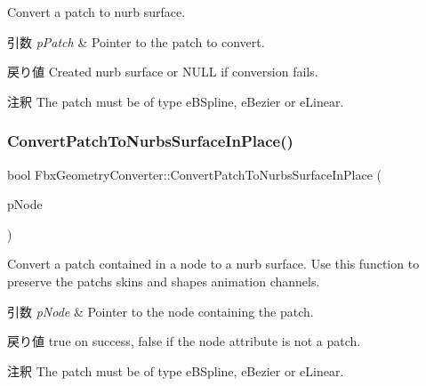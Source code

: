 Convert a patch to nurb surface. 
\begin{DoxyParams}{引数}
{\em p\+Patch} & Pointer to the patch to convert. \\
\hline
\end{DoxyParams}
\begin{DoxyReturn}{戻り値}
Created nurb surface or {\ttfamily N\+U\+LL} if conversion fails. 
\end{DoxyReturn}
\begin{DoxyRemark}{注釈}
The patch must be of type e\+B\+Spline, e\+Bezier or e\+Linear. 
\end{DoxyRemark}
\mbox{\label{class_fbx_geometry_converter_afd5bc619771c69c680b2da7ae4d0c2e4}} 
\subsubsection{\texorpdfstring{Convert\+Patch\+To\+Nurbs\+Surface\+In\+Place()}{ConvertPatchToNurbsSurfaceInPlace()}}
{\footnotesize\ttfamily bool Fbx\+Geometry\+Converter\+::\+Convert\+Patch\+To\+Nurbs\+Surface\+In\+Place (\begin{DoxyParamCaption}\item[{\hyperlink{class_fbx_node}{Fbx\+Node} $\ast$}]{p\+Node }\end{DoxyParamCaption})}

Convert a patch contained in a node to a nurb surface. Use this function to preserve the patch\textquotesingle{}s skins and shapes animation channels. 
\begin{DoxyParams}{引数}
{\em p\+Node} & Pointer to the node containing the patch. \\
\hline
\end{DoxyParams}
\begin{DoxyReturn}{戻り値}
{\ttfamily true} on success, {\ttfamily false} if the node attribute is not a patch. 
\end{DoxyReturn}
\begin{DoxyRemark}{注釈}
The patch must be of type e\+B\+Spline, e\+Bezier or e\+Linear. 
\end{DoxyRemark}
\mbox{\label{class_fbx_geometry_converter_a3c79ca6723b51b564842b9563f67102f}} 
